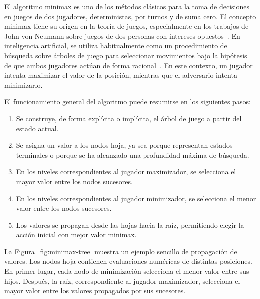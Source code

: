 El algoritmo minimax es uno de los métodos clásicos para la toma de decisiones en juegos de dos jugadores, deterministas, por turnos y de suma cero. El concepto minimax tiene su origen en la teoría de juegos, especialmente en los trabajos de John von Neumann sobre juegos de dos personas con intereses opuestos~\cite{kjeldsen2001minimax}. En inteligencia artificial, se utiliza habitualmente como un procedimiento de búsqueda sobre árboles de juego para seleccionar movimientos bajo la hipótesis de que ambos jugadores actúan de forma racional~\cite{russell2020aima,poole2023foundations}. En este contexto, un jugador intenta maximizar el valor de la posición, mientras que el adversario intenta minimizarlo.

El funcionamiento general del algoritmo puede resumirse en los siguientes pasos:

\begin{enumerate}
    \item Se construye, de forma explícita o implícita, el árbol de juego a partir del estado actual.
    \item Se asigna un valor a los nodos hoja, ya sea porque representan estados terminales o porque se ha alcanzado una profundidad máxima de búsqueda.
    \item En los niveles correspondientes al jugador maximizador, se selecciona el mayor valor entre los nodos sucesores.
    \item En los niveles correspondientes al jugador minimizador, se selecciona el menor valor entre los nodos sucesores.
    \item Los valores se propagan desde las hojas hacia la raíz, permitiendo elegir la acción inicial con mejor valor minimax.
\end{enumerate}

La Figura~\ref{fig:minimax-tree} muestra un ejemplo sencillo de propagación de valores. Los nodos hoja contienen evaluaciones numéricas de distintas posiciones. En primer lugar, cada nodo de minimización selecciona el menor valor entre sus hijos. Después, la raíz, correspondiente al jugador maximizador, selecciona el mayor valor entre los valores propagados por sus sucesores.

\vspace{0.5cm}

